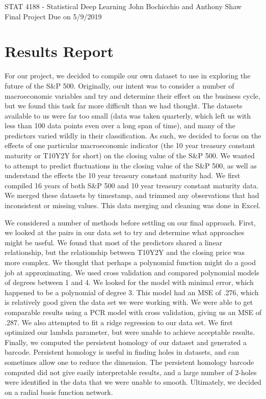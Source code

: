 \documentclass[12pt]{article}
\begin{document}
\pagestyle{plain}
\begin{center}
STAT 4188 - Statistical Deep Learning  \hfill John Bochicchio and Anthony Shaw \\
Final Project \hfill  Due on 5/9/2019
\end{center}
\section{Results Report}
\tab For our project, we decided to compile our own dataset to use in exploring the future of the S\&P 500. Originally, our intent was to consider a number of macroeconomic variables and try and determine their effect on the business cycle, but we found this task far more difficult than we had thought. The datasets available to us were far too small (data was taken quarterly, which left us with less than 100 data points even over a long span of time), and many of the predictors varied wildly in their classification. As such, we decided to focus on the effects of one particular macroeconomic indicator (the 10 year treasury constant maturity or T10Y2Y for short) on the closing value of the S\&P 500. We wanted to attempt to predict fluctuations in the closing value of the S\&P 500, as well as understand the effects the 10 year treasury constant maturity had. We first compiled 16 years of both S\&P 500 and 10 year treasury constant maturity data. We merged these datasets by timestamp, and trimmed any observations that had inconsistent or missing values. This data merging and cleaning was done in Excel. 

    We considered a number of methods before settling on our final approach. First, we looked at the pairs in our data set to try and determine what approaches might be useful. We found that most of the predictors shared a linear relationship, but the relationship between T10Y2Y and the closing price was more complex. We thought that perhaps a polynomial function might do a good job at approximating. We used cross validation and compared polynomial models of degrees between 1 and 4. We looked for the model with minimal error, which happened to be a polynomial of degree 3. This model had an MSE of .276, which is relatively good given the data set we were working with. We were able to get comparable results using a PCR model with cross validation, giving us an MSE of .287. We also attempted to fit a ridge regression to our data set. We first optimized our lambda parameter, but were unable to achieve acceptable results. Finally, we computed the persistent homology of our dataset and generated a barcode. Persistent homology is useful in finding holes in datasets, and can sometimes allow one to reduce the dimension. The persistent homology barcode computed did not give easily interpretable results, and a large number of 2-holes were identified in the data that we were unable to smooth. Ultimately, we decided on a radial basis function network.
    
\end{document}
